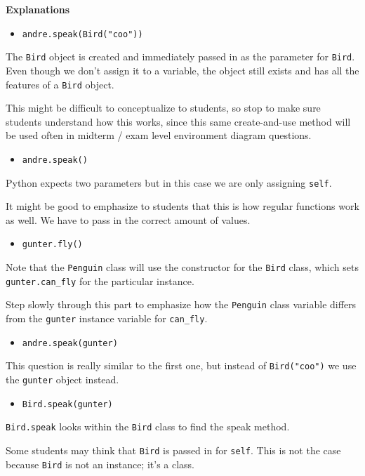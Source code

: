 \begin{blocksection}
\begin{solution}
\textbf{Explanations}

\begin{itemize}
    \item \lstinline{andre.speak(Bird("coo"))}
\end{itemize}
The \lstinline{Bird} object is created and immediately passed in as the parameter for \lstinline{Bird}. Even though we don't assign it to a variable, the object still exists and has all the features of a \lstinline{Bird} object.
\begin{guide}
This might be difficult to conceptualize to students, so stop to make sure students understand how this works, since this same create-and-use method will be used often in midterm / exam level environment diagram questions.
\end{guide}

\begin{itemize}
    \item \lstinline{andre.speak()}
\end{itemize}
Python expects two parameters but in this case we are only assigning \lstinline{self}.
\begin{guide}
It might be good to emphasize to students that this is how regular functions work as well. We have to pass in the correct amount of values.
\end{guide}

\begin{itemize}
    \item \lstinline{gunter.fly()}
\end{itemize}
Note that the \lstinline{Penguin} class will use the constructor for the \lstinline{Bird} class, which sets \lstinline{gunter.can_fly} for the particular instance.
\begin{guide}
Step slowly through this part to emphasize how the \lstinline{Penguin} class variable differs from the \lstinline{gunter} instance variable for \lstinline{can_fly}.
\end{guide}

\begin{itemize}
    \item \lstinline{andre.speak(gunter)}
\end{itemize}
This question is really similar to the first one, but instead of \lstinline{Bird("coo")} we use the \lstinline{gunter} object instead.

\begin{itemize}
    \item \lstinline{Bird.speak(gunter)}
\end{itemize}
\lstinline{Bird.speak} looks within the \lstinline{Bird} class to find the speak method. 
\begin{guide}
    Some students may think that \lstinline{Bird} is passed in for \lstinline{self}. This is not the case because \lstinline{Bird} is not an instance; it’s a class.
\end{guide}

\end{solution}    
\end{blocksection}